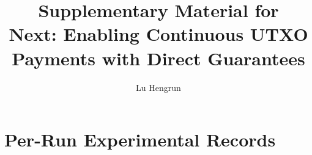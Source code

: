 \documentclass[letterpaper,11pt,onecolumn,journal]{IEEEtran}
\title{Supplementary Material for\\Next: Enabling Continuous UTXO Payments with Direct Guarantees}
\author{Lu Hengrun}
\begin{document}
\maketitle






\clearpage
\section{Per-Run Experimental Records}



\end{document}
